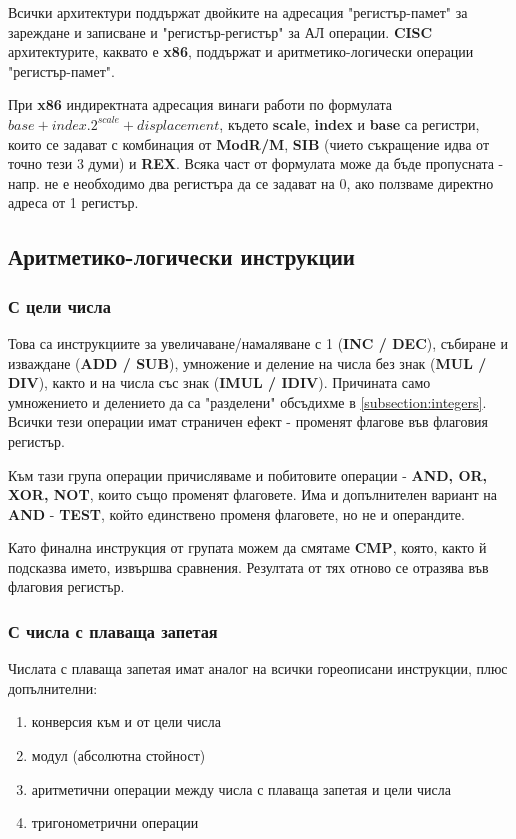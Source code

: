 \documentclass[fleqn,12pt]{article}
\begin{document}
Всички архитектури поддържат двойките на адресация "регистър-памет" за зареждане и записване и "регистър-регистър" за АЛ операции. 
\textbf{CISC} архитектурите, каквато е \textbf{x86}, поддържат и аритметико-логически операции "регистър-памет".

При \textbf{x86} индиректната адресация винаги работи по формулата $ base + index . 2^{scale} + displacement $,
където \textbf{scale}, \textbf{index} и \textbf{base} са регистри, които се задават с комбинация от 
\textbf{ModR/M}, \textbf{SIB} (чието съкращение идва от точно тези 3 думи) и \textbf{REX}. Всяка част от формулата
може да бъде пропусната - напр. не е необходимо два регистъра да се задават на 0, ако ползваме директно адреса от 1 регистър.

\subsection{Аритметико-логически инструкции}
\subsubsection{С цели числа}
Това са инструкциите за увеличаване/намаляване с 1 (\textbf{INC / DEC}), събиране и изваждане (\textbf{ADD / SUB}),
умножение и деление на числа без знак (\textbf{MUL / DIV}), както и на числа със знак (\textbf{IMUL / IDIV}).
Причината само умножението и делението да са "разделени" обсъдихме в \ref{subsection:integers}.
Всички тези операции имат страничен ефект - променят флагове във флаговия регистър.

Към тази група операции причисляваме и побитовите операции - \textbf{AND, OR, XOR, NOT}, които също променят флаговете.
Има и допълнителен вариант на \textbf{AND} - \textbf{TEST}, който единствено променя флаговете, но не и операндите.

Като финална инструкция от групата можем да смятаме \textbf{CMP}, която, както й подсказва името, извършва сравнения.
Резултата от тях отново се отразява във флаговия регистър.

\subsubsection{С числа с плаваща запетая}
Числата с плаваща запетая имат аналог на всички гореописани инструкции, плюс допълнителни:
\begin{enumerate}
    \item конверсия към и от цели числа
    \item модул (абсолютна стойност)
    \item аритметични операции между числа с плаваща запетая и цели числа
    \item тригонометрични операции
\end{enumerate}
\end{document}
